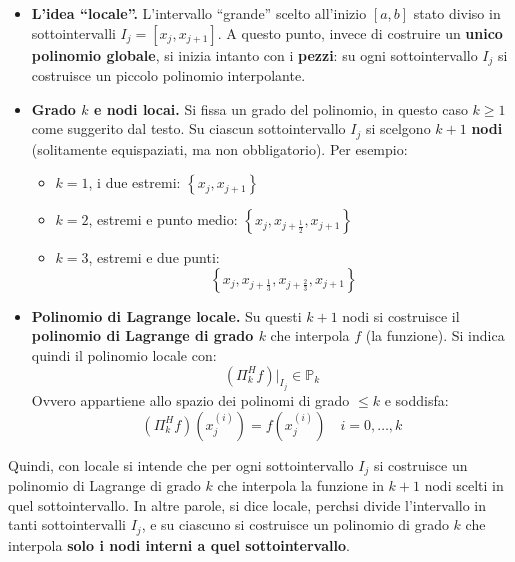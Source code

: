 \begin{itemize}
\begin{takeawaysbox}
\begin{itemize}
\begin{enumerate}
                \begin{itemize}
                    \item[\textcolor{Green3}{\faIcon{question-circle}}] \textcolor{Green3}{\textbf{L'idea ``locale''.}} L'intervallo ``grande'' scelto all'inizio $\left[a,b\right]$ \eaccent stato diviso in sottointervalli $I_{j} = \left[x_{j}, x_{j+1}\right]$. A questo punto, invece di costruire un \textbf{unico polinomio globale}, si inizia intanto con i \textbf{pezzi}: su ogni sottointervallo $I_{j}$ si costruisce un piccolo polinomio interpolante.
                    \item[\textcolor{Green3}{\faIcon{question-circle}}] \textcolor{Green3}{\textbf{Grado $k$ e nodi locai.}} Si fissa un grado del polinomio, in questo caso $k \ge 1$ come suggerito dal testo. Su ciascun sottointervallo $I_{j}$ si scelgono $k+1$ \textbf{nodi} (solitamente equispaziati, ma non \eaccent obbligatorio). Per esempio:
                    \begin{itemize}
                        \item $k=1$, i due estremi: $\left\{x_{j}, x_{j+1}\right\}$
                        \item $k=2$, estremi e punto medio: $\left\{x_{j}, x_{j+\frac{1}{2}}, x_{j+1}\right\}$
                        \item $k=3$, estremi e due punti:
                        \begin{equation*}
                            \left\{x_{j}, x_{j+\frac{1}{3}}, x_{j+\frac{2}{3}}, x_{j+1}\right\}
                        \end{equation*}
                    \end{itemize}
                    \item[\textcolor{Green3}{\faIcon{question-circle}}] \textcolor{Green3}{\textbf{Polinomio di Lagrange locale.}} Su questi $k+1$ nodi si costruisce il \textbf{polinomio di Lagrange di grado $k$} che interpola $f$ (la funzione). Si indica quindi il polinomio locale con:
                    \begin{equation*}
                        \left(\Pi_{k}^{H} f\right) |_{I_{j}} \in \mathbb{P}_{k}
                    \end{equation*}
                    Ovvero appartiene allo spazio dei polinomi di grado $\le k$ e soddisfa:
                    \begin{equation*}
                        \left(\Pi_{k}^{H} f\right)\left(x_{j}^{\left(i\right)}\right) = f\left(x_{j}^{(i)}\right) \quad i = 0, \dots, k
                    \end{equation*}
                \end{itemize}
                Quindi, con locale si intende che per ogni sottointervallo $I_{j}$ si costruisce un polinomio di Lagrange di grado $k$ che interpola la funzione in $k+1$ nodi scelti in quel sottointervallo. In altre parole, si dice locale, perch\eaccent si divide l'intervallo in tanti sottointervalli $I_{j}$, e su ciascuno si costruisce un polinomio di grado $k$ che interpola \textbf{solo i nodi interni a quel sottointervallo}.


\end{enumerate}
\end{itemize}
\end{takeawaysbox}
\end{itemize}
